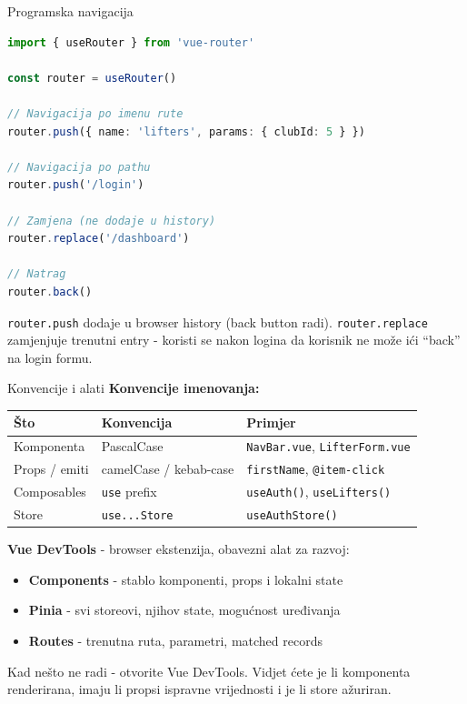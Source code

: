 \begin{frame}[fragile,shrink=5]{Programska navigacija}
\begin{lstlisting}[language=typescript]
import { useRouter } from 'vue-router'

const router = useRouter()

// Navigacija po imenu rute
router.push({ name: 'lifters', params: { clubId: 5 } })

// Navigacija po pathu
router.push('/login')

// Zamjena (ne dodaje u history)
router.replace('/dashboard')

// Natrag
router.back()
\end{lstlisting}

\vspace{0.4em}
\texttt{router.push} dodaje u browser history (back button radi). \texttt{router.replace} zamjenjuje trenutni entry - koristi se nakon logina da korisnik ne može ići \enquote{back} na login formu.
\end{frame}

\begin{frame}{Konvencije i alati}
\textbf{Konvencije imenovanja:}

\vspace{0.2em}
\begin{tabular}{@{}llp{5.5cm}@{}}
  \toprule
  \textbf{Što} & \textbf{Konvencija} & \textbf{Primjer} \\
  \midrule
  Komponenta & PascalCase & \texttt{NavBar.vue}, \texttt{LifterForm.vue} \\
  Props / emiti & camelCase / kebab-case & \texttt{firstName}, \texttt{@item-click} \\
  Composables & \texttt{use} prefix & \texttt{useAuth()}, \texttt{useLifters()} \\
  Store & \texttt{use...Store} & \texttt{useAuthStore()} \\
  \bottomrule
\end{tabular}

\vspace{0.8em}
\textbf{Vue DevTools} - browser ekstenzija, obavezni alat za razvoj:
\begin{itemize}
  \item \textbf{Components} - stablo komponenti, props i lokalni state
  \item \textbf{Pinia} - svi storeovi, njihov state, mogućnost uređivanja
  \item \textbf{Routes} - trenutna ruta, parametri, matched records
\end{itemize}

\vspace{0.4em}
Kad nešto ne radi - otvorite Vue DevTools. Vidjet ćete je li komponenta renderirana, imaju li propsi ispravne vrijednosti i je li store ažuriran.
\end{frame}

